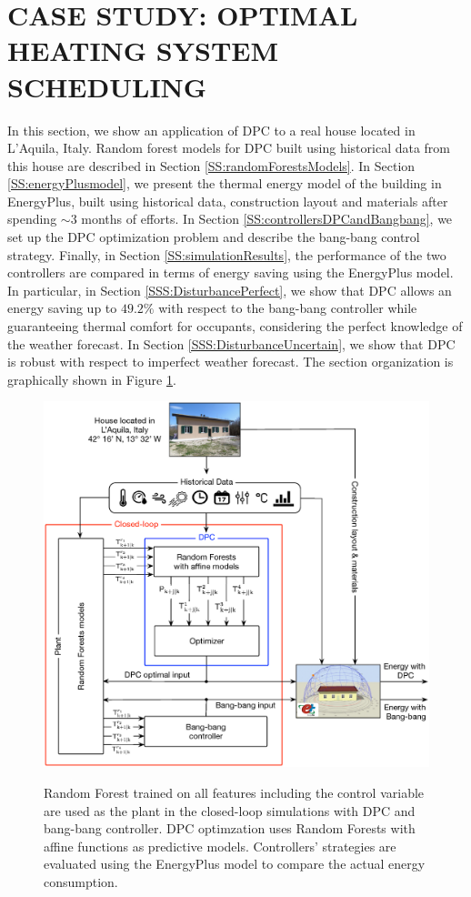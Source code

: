\section{CASE STUDY: OPTIMAL HEATING SYSTEM SCHEDULING}
\label{S:realCaseStudy}

In this section, we show an application of DPC to a real house located in L'Aquila, Italy. Random forest models for DPC built using historical data from this house are described in Section \ref{SS:randomForestsModels}. 
In Section \ref{SS:energyPlusmodel}, we present the thermal energy model of the building in EnergyPlus, built using historical data, construction layout and materials after spending $\sim3$ months of efforts.
In Section \ref{SS:controllersDPCandBangbang}, we set up the DPC optimization problem and describe the bang-bang control strategy.
Finally, in Section \ref{SS:simulationResults}, the performance of the two controllers are compared in terms of energy saving using the EnergyPlus model.
\textcolor[rgb]{0,0,1}{In particular, in Section \ref{SSS:DisturbancePerfect}, we show that DPC allows an energy saving up to $49.2\%$ with respect to the bang-bang controller while guaranteeing thermal comfort for occupants, considering the perfect knowledge of the weather forecast. 
In Section \ref{SSS:DisturbanceUncertain}, we show that DPC is robust with respect to imperfect weather forecast.}
The section organization is graphically shown in Figure \ref{F:overview}.
\begin{figure}[h!]
	\begin{center}
		\includegraphics[width=1\linewidth]{figures/overview.eps}
		\caption{Random Forest trained on all features including the control variable are used as the plant in the closed-loop simulations with DPC and bang-bang controller. DPC optimzation uses Random Forests with affine functions as predictive models. Controllers' strategies are evaluated using the EnergyPlus model to compare the actual energy consumption.}
		\captionsetup{justification=centering}
		\label{F:overview}
	\end{center}
\end{figure}

